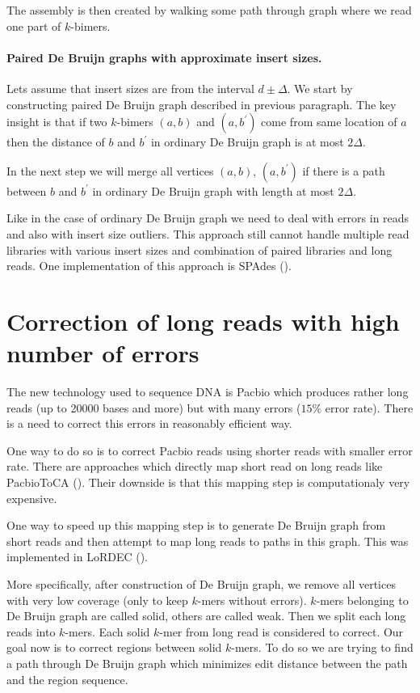 The assembly is then created by walking some path through graph where we read one part of $k$-bimers.

\paragraph{Paired De Bruijn graphs with approximate insert sizes.}
Lets assume that insert sizes are from the interval $d \pm \Delta$.
We start by constructing paired De Bruijn graph described in previous paragraph.
The key insight is that if two $k$-bimers $(a, b)$ and $(a, b^{'})$ come from
same location of $a$ then the distance of $b$ and $b^{'}$ in ordinary De Bruijn graph is at most $2\Delta$.

In the next step we will merge all vertices $(a, b)$, $(a, b^{'})$ if there is a path
between $b$ and $b^{'}$ in ordinary De Bruijn graph with length at most $2\Delta$.

\bigskip
Like in the case of ordinary De Bruijn graph we need to deal with errors in reads
and also with insert size outliers. This approach still cannot handle multiple
read libraries with various insert sizes and combination of paired libraries and long reads.
One implementation of this approach is SPAdes (\cite{Spades}).


\section{Correction of long reads with high number of errors}

The new technology used to sequence DNA is Pacbio which produces
rather long reads (up to 20000 bases and more) but with many errors
($15\%$ error rate). There is a need to correct this errors in reasonably
efficient way.

One way to do so is to correct Pacbio reads using shorter reads with smaller
error rate. There are approaches which directly map short read on long reads like
PacbioToCA (\cite{PacbioToCA}). Their downside is that this mapping step
is computationaly very expensive.

One way to speed up this mapping step is to generate De Bruijn graph from short reads
and then attempt to map long reads to paths in this graph. This was implemented
in LoRDEC (\cite{Lordec}).

More specifically, after construction of De Bruijn graph, we remove all vertices
with very low coverage (only to keep $k$-mers without errors). $k$-mers belonging
to De Bruijn graph are called solid, others are called weak.
Then we split each long reads into $k$-mers. Each solid $k$-mer from long read is considered to correct. 
Our goal now is to correct regions between solid $k$-mers. To do so we are trying
to find a path through De Bruijn graph which minimizes edit distance between the path
and the region sequence. 
